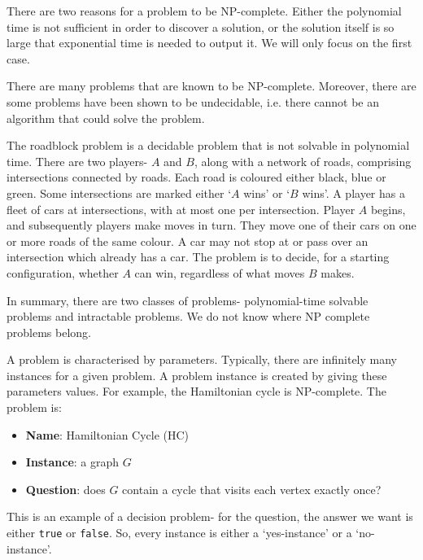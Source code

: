 \documentclass[a4paper, openany]{memoir}
\begin{document}
There are two reasons for a problem to be NP-complete. Either the polynomial time is not sufficient in order to discover a solution, or the solution itself is so large that exponential time is needed to output it. We will only focus on the first case. 

There are many problems that are known to be NP-complete. Moreover, there are some problems have been shown to be undecidable, i.e. there cannot be an algorithm that could solve the problem.

The roadblock problem is a decidable problem that is not solvable in polynomial time. There are two players- $A$ and $B$, along with a network of roads, comprising intersections connected by roads. Each road is coloured either black, blue or green. Some intersections are marked either `$A$ wins' or `$B$ wins'. A player has a fleet of cars at intersections, with at most one per intersection. Player $A$ begins, and subsequently players make moves in turn. They move one of their cars on one or more roads of the same colour. A car may not stop at or pass over an intersection which already has a car. The problem is to decide, for a starting configuration, whether $A$ can win, regardless of what moves $B$ makes.

In summary, there are two classes of problems- polynomial-time solvable problems and intractable problems. We do not know where NP complete problems belong.

A problem is characterised by parameters. Typically, there are infinitely many instances for a given problem. A problem instance is created by giving these parameters values. For example, the Hamiltonian cycle is NP-complete. The problem is:
\begin{itemize}
    \item \textbf{Name}: Hamiltonian Cycle (HC)
    \item \textbf{Instance}: a graph $G$
    \item \textbf{Question}: does $G$ contain a cycle that visits each vertex exactly once?
\end{itemize}
This is an example of a decision problem- for the question, the answer we want is either \texttt{true} or \texttt{false}. So, every instance is either a `yes-instance' or a `no-instance'. 
\end{document}
